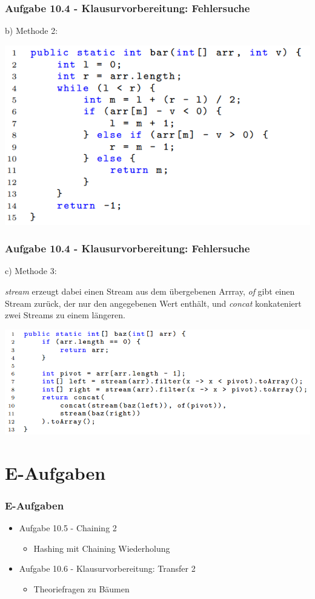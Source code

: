 \documentclass{beamer}
\begin{document}
\begin{frame}
  \frametitle{Aufgabe 10.4 - Klausurvorbereitung: Fehlersuche}
  \small
  b) Methode 2:


  \bigskip
  \includegraphics[scale=0.45]{images/10_4_b.png}
\end{frame}

\begin{frame}
  \frametitle{Aufgabe 10.4 - Klausurvorbereitung: Fehlersuche}
  \small
  c) Methode 3:

  \smallskip
  \textit{stream} erzeugt dabei einen Stream aus dem übergebenen Arrray, \textit{of} gibt
  einen Stream zurück, der nur den angegebenen Wert enthält, und \textit{concat} konkateniert
  zwei Streams zu einem längeren.

  \bigskip
  \includegraphics[scale=0.45]{images/10_4_c.png}
\end{frame}

\section{E-Aufgaben}
\begin{frame}
  \frametitle{E-Aufgaben}
  \begin{itemize}
    \item Aufgabe 10.5 - Chaining 2 \\
          \begin{itemize}
            \item Hashing mit Chaining Wiederholung
          \end{itemize}
    \item Aufgabe 10.6 - Klausurvorbereitung: Transfer 2 \\
          \begin{itemize}
            \item Theoriefragen zu Bäumen
          \end{itemize}
  \end{itemize}
\end{frame}
\end{document}
